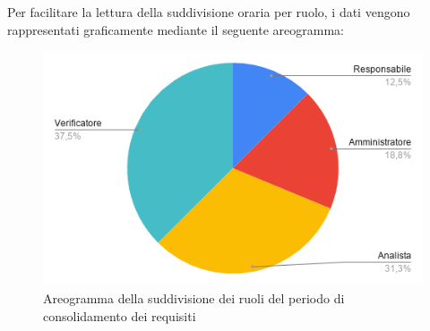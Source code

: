 \documentclass[../piano-di-progetto.tex]{subfiles}
\begin{document}
  Per facilitare la lettura della suddivisione oraria per ruolo, i dati vengono rappresentati graficamente mediante il seguente areogramma:
  \begin{figure}[H]
    \centering
    \includegraphics[width=12cm]{img/ruoli-consolidamento.png}
    \caption{Areogramma della suddivisione dei ruoli del periodo di consolidamento dei requisiti}
    \label{fig:ore-ruolo-consolidamento}
  \end{figure}
\end{document}

